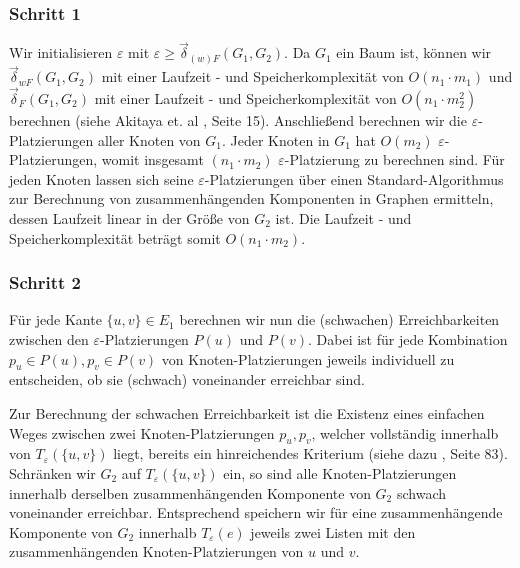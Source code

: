 \documentclass[a4paper, 12pt, twoside]{article}
\theoremstyle{Format1} %
\begin{document}
\subsubsection{Schritt 1} \label{Schritt 1}
Wir initialisieren $\varepsilon$ mit $\varepsilon \geq \vec{\delta}_{(w)F}(G_1, G_2)$.
Da $G_1$ ein Baum ist, können wir
$\vec{\delta}_{wF}(G_1, G_2)$ mit einer Laufzeit - und Speicherkomplexität von $O(n_1 \cdot m_1)$ und $\vec{\delta}_F(G_1, G_2)$ mit einer Laufzeit - und Speicherkomplexität
von $O(n_1 \cdot m_2^2)$ berechnen (siehe Akitaya et. al \cite{Akitaya}, Seite 15).
Anschließend berechnen wir die $\varepsilon$-Platzierungen aller Knoten von $G_1$. Jeder Knoten in $G_1$ hat $O(m_2)$
$\varepsilon$-Platzierungen, womit insgesamt $(n_1 \cdot m_2)$ $\varepsilon$-Platzierung zu berechnen sind.
Für jeden Knoten lassen sich seine $\varepsilon$-Platzierungen über einen Standard-Algorithmus zur Berechnung von
zusammenhängenden Komponenten in Graphen ermitteln, dessen Laufzeit linear in der Größe von $G_2$ ist.
Die Laufzeit - und Speicherkomplexität beträgt somit $O(n_1 \cdot m_2)$.

\subsubsection{Schritt 2} \label{Schritt 2}
Für jede Kante $\{u, v\} \in E_1$ berechnen wir nun die (schwachen) Erreichbarkeiten zwischen den $\varepsilon$-Platzierungen $P(u)$ und $P(v)$.
Dabei ist für jede Kombination $p_u \in P(u), p_v \in P(v)$ von Knoten-Platzierungen jeweils individuell zu entscheiden, ob sie (schwach) voneinander erreichbar sind.

Zur Berechnung der schwachen Erreichbarkeit ist die Existenz eines einfachen Weges zwischen zwei Knoten-Platzierungen
$p_u,p_v$, welcher vollständig innerhalb von $T_{\varepsilon}(\{u,v\})$ liegt, bereits ein hinreichendes Kriterium (siehe dazu \cite{Alt}, Seite 83).
Schränken wir $G_2$ auf $T_{\varepsilon}(\{u,v\})$ ein, so sind alle Knoten-Platzierungen innerhalb derselben zusammenhängenden Komponente von $G_2$
schwach voneinander erreichbar. Entsprechend speichern wir für eine zusammenhängende Komponente von $G_2$ innerhalb $T_{\varepsilon}(e)$ jeweils zwei Listen mit den
zusammenhängenden Knoten-Platzierungen von $u$ und $v$.
\end{document}
